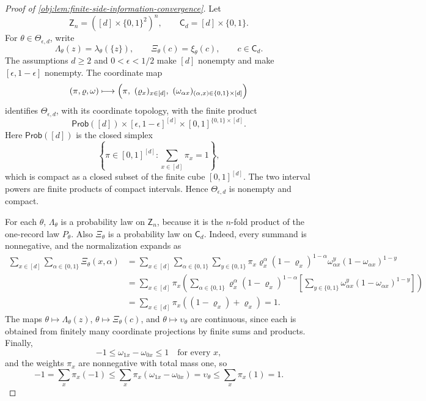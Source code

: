 \begin{proof}[Proof of \cref{obj:lem:finite-side-information-convergence}]
Let
\[
\mathsf Z_n=([d]\times\{0,1\}^2)^n,
\qquad
\mathsf C_d=[d]\times\{0,1\}.
\]
For \(\theta\in\Theta_{\epsilon,d}\), write
\[
\Lambda_\theta(z)=\lambda_\theta(\{z\}),\qquad
\Xi_\theta(c)=\xi_\theta(c),\qquad c\in\mathsf C_d .
\]
The assumptions \(d\ge2\) and \(0<\epsilon<1/2\) make \([d]\) nonempty and make
\([\epsilon,1-\epsilon]\) nonempty. The coordinate map
\[
(\pi,\varrho,\omega)
\longmapsto
\Bigl(\pi,\ (\varrho_x)_{x\in[d]},\ (\omega_{\alpha x})_{(\alpha,x)\in\{0,1\}\times[d]}\Bigr)
\]
identifies \(\Theta_{\epsilon,d}\), with its coordinate topology, with the finite product
\[
\mathsf{Prob}([d])
\times
[\epsilon,1-\epsilon]^{[d]}
\times
[0,1]^{\{0,1\}\times[d]} .
\]
Here \(\mathsf{Prob}([d])\) is the closed simplex
\[
\left\{\pi\in[0,1]^{[d]}:\sum_{x\in[d]}\pi_x=1\right\},
\]
which is compact as a closed subset of the finite cube \([0,1]^{[d]}\). The two interval powers are finite products of compact intervals. Hence \(\Theta_{\epsilon,d}\) is nonempty and compact.

For each \(\theta\), \(\Lambda_\theta\) is a probability law on \(\mathsf Z_n\), because it is the
\(n\)-fold product of the one-record law \(P_\theta\). Also \(\Xi_\theta\) is a probability law on
\(\mathsf C_d\). Indeed, every summand is nonnegative, and the normalization expands as
\[
\begin{aligned}
\sum_{x\in[d]}\sum_{\alpha\in\{0,1\}}\Xi_\theta(x,\alpha)
&=
\sum_{x\in[d]}\sum_{\alpha\in\{0,1\}}\sum_{y\in\{0,1\}}
\pi_x\varrho_x^\alpha(1-\varrho_x)^{1-\alpha}
\omega_{\alpha x}^y(1-\omega_{\alpha x})^{1-y}\\
&=
\sum_{x\in[d]}\pi_x
\left(\sum_{\alpha\in\{0,1\}}\varrho_x^\alpha(1-\varrho_x)^{1-\alpha}
\left[\sum_{y\in\{0,1\}}\omega_{\alpha x}^y(1-\omega_{\alpha x})^{1-y}\right]\right)\\
&=
\sum_{x\in[d]}\pi_x
\left((1-\varrho_x)+\varrho_x\right)
=1 .
\end{aligned}
\]
The maps \(\theta\mapsto\Lambda_\theta(z)\), \(\theta\mapsto\Xi_\theta(c)\), and
\(\theta\mapsto\upsilon_\theta\) are continuous, since each is obtained from finitely many coordinate
projections by finite sums and products. Finally,
\[
-1\le \omega_{1x}-\omega_{0x}\le1
\quad\text{for every }x,
\]
and the weights \(\pi_x\) are nonnegative with total mass one, so
\[
-1
=
\sum_x\pi_x(-1)
\le
\sum_x\pi_x(\omega_{1x}-\omega_{0x})
=
\upsilon_\theta
\le
\sum_x\pi_x(1)
=
1 .
\]


\end{proof}
